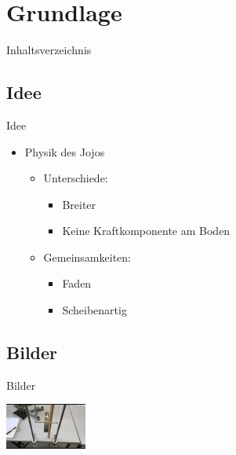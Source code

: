 \section{Grundlage}

\begin{frame}{Inhaltsverzeichnis}
\end{frame} 

\subsection{Idee}
\begin{frame}[t]{Idee}
    
\begin{itemize}
\item Physik des Jojos \pause %
\begin{itemize}
\item Unterschiede: \pause %
    \begin{itemize}
\item Breiter \pause
\item Keine Kraftkomponente am Boden \pause
\end{itemize}
\item Gemeinsamkeiten: \pause %
\begin{itemize}
\item Faden \pause 
\item Scheibenartig 
\end{itemize}
\end{itemize}
\end{itemize}
\end{frame}

\subsection{Bilder}
\begin{frame}{Bilder}
    \begin{center}
        \includegraphics[width=0.2\textwidth]{build/Bild1.jpg} %
    \end{center}
\end{frame}

